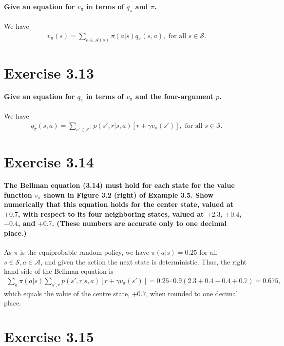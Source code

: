 \documentclass[a4paper,11pt]{article}
\numberwithin{equation}{section}
\theoremstyle{remark}
\begin{document}
\textbf{Give an equation for $v_\pi$ in terms of $q_\pi$ and $\pi$.}
\\ \\
We have 
\begin{align*}
	v_\pi(s) = \sum_{a \in \mathcal{A}(s)}^{} \pi(a|s) q_\pi(s, a), \text{ for all } s \in \mathcal{S}.
\end{align*}

\section{Exercise 3.13}

\textbf{Give an equation for $q_\pi$ in terms of $v_\pi$ and the four-argument $p$.}
\\ \\
We have 
\begin{align*}
	q_\pi(s, a) = \sum_{s' \in \mathcal{S}^+}^{} p(s', r | s, a) [r + \gamma v_\pi(s')], \text{ for all } s \in \mathcal{S}.
\end{align*}

\section{Exercise 3.14}

\textbf{The Bellman equation (3.14) must hold for each state for the value function $v_\pi$ shown in Figure 3.2 (right) of Example 3.5. Show numerically that this equation holds for the center state, valued at $+0.7$, with respect to its four neighboring states, valued at $+2.3$, $+0.4$, $-0.4$, and $+0.7$. (These numbers are accurate only to one decimal place.) }
\\ \\
As $\pi$ is the equiprobable random policy, we have $\pi(a | s) = 0.25$ for all $s \in \mathcal{S}, a \in \mathcal{A}$, and given the action the next state is deterministic. Thus, the right hand side of the Bellman equation is
\begin{align*}
	\sum_{a}^{} \pi(a | s) \sum_{s', r}^{} p(s', r | s, a)[r + \gamma v_\pi(s')] = 0.25 \cdot 0.9 (2.3 + 0.4 - 0.4 + 0.7) = 0.675,
\end{align*}
which equals the value of the centre state, $+0.7$, when rounded to one decimal place.

\section{Exercise 3.15}
\end{document}
